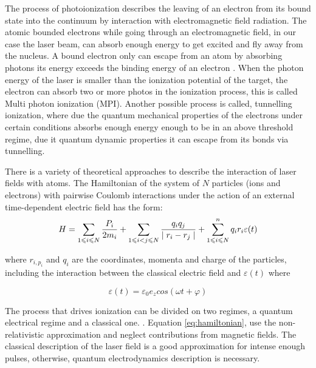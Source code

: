 The process of photoionization describes the leaving of an electron from its bound state  into the continuum by interaction with electromagnetic field radiation\cite{berkowitz_photoabsorption_1979}. The atomic bounded electrons while going through an electromagnetic field, in our case the laser beam,  can absorb enough  energy to get excited and fly away from the nucleus. A bound electron only can escape from an atom by absorbing photons its energy exceeds the binding energy of an electron \cite{einstein_uber_1905}. When the photon energy of the laser is smaller than the ionization potential of the target, the electron can absorb two or more photos in the ionization process, this is called Multi photon ionization (MPI). Another possible process is called, tunnelling ionization, where due the quantum mechanical properties of the electrons under certain conditions absorbs enough energy enough to be in an above threshold regime, due it quantum dynamic properties it can escape from its bonds via tunnelling.

There is a variety of theoretical approaches to describe the interaction of  laser fields with atoms. The Hamiltonian of the system of $N$ particles (ions and electrons) with pairwise Coulomb interactions under the action of an external time-dependent electric field has the form:
\begin{equation}  \label{eq:hamiltonian}
\centering
H = \displaystyle\sum_{1 \leqslant i \leqslant N}^{} \dfrac{P_{i}}{2m_{i}} + \displaystyle\sum_{1 \leqslant i < j \leqslant N}^{} \dfrac{q_{i}q_{j}}{\mid r_{i}-r_{j} \mid} + \displaystyle\sum_{1 \leqslant i \leqslant N}^{n} q_{i}r_{i}\varepsilon(t)
\end{equation}

where $ r_{i,  p_{i}} $ and $ q_{i} $ are the coordinates, momenta and charge of the particles, including the interaction between the classical electric field and $ \varepsilon(t) $ where \cite{mikaberidze_atomic_1981}

\begin{equation}
\varepsilon(t) = \varepsilon_{0} e_{z}cos(\omega t + \varphi)
\end{equation}

The process that drives ionization can be divided on two regimes, a quantum electrical regime and a classical one. \cite{karnakov_strong_2009}. Equation \ref{eq:hamiltonian}, use the non-relativistic approximation and neglect contributions from magnetic fields. The classical description of the laser field is a good approximation for intense enough pulses, otherwise, quantum electrodynamics description is necessary.

